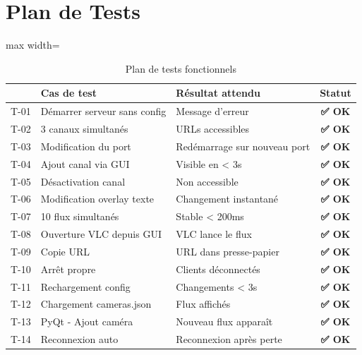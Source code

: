 \documentclass[12pt,a4paper]{report}
\newcommand{\success}[1]{\textcolor{accentGreen}{\textbf{#1}}}
\begin{document}
\chapter{Plan de Tests}

\begin{table}[H]
    \centering
    \caption{Plan de tests fonctionnels}
    \label{tab:tests}
    \begin{adjustbox}{max width=\textwidth}
    \begin{tabular}{|c|l|l|c|}
        \hline
        \rowcolor{primaryBlue!80}
        \multicolumn{1}{|c|}{\color{white}\textbf{ID}} & 
        \color{white}\textbf{Cas de test} & 
        \color{white}\textbf{Résultat attendu} & 
        \color{white}\textbf{Statut} \\
        \hline
        T-01 & Démarrer serveur sans config & Message d'erreur & \success{✅ OK} \\
        T-02 & 3 canaux simultanés & URLs accessibles & \success{✅ OK} \\
        T-03 & Modification du port & Redémarrage sur nouveau port & \success{✅ OK} \\
        T-04 & Ajout canal via GUI & Visible en < 3s & \success{✅ OK} \\
        T-05 & Désactivation canal & Non accessible & \success{✅ OK} \\
        T-06 & Modification overlay texte & Changement instantané & \success{✅ OK} \\
        T-07 & 10 flux simultanés & Stable < 200ms & \success{✅ OK} \\
        T-08 & Ouverture VLC depuis GUI & VLC lance le flux & \success{✅ OK} \\
        T-09 & Copie URL & URL dans presse-papier & \success{✅ OK} \\
        T-10 & Arrêt propre & Clients déconnectés & \success{✅ OK} \\
        T-11 & Rechargement config & Changements < 3s & \success{✅ OK} \\
        T-12 & Chargement cameras.json & Flux affichés & \success{✅ OK} \\
        T-13 & PyQt - Ajout caméra & Nouveau flux apparaît & \success{✅ OK} \\
        T-14 & Reconnexion auto & Reconnexion après perte & \success{✅ OK} \\
        \hline
    \end{tabular}
    \end{adjustbox}
\end{table}
\end{document}
